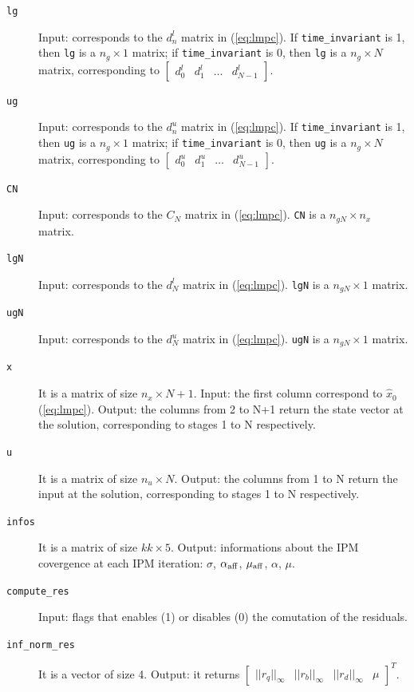 \documentclass[a4paper]{report}
\begin{document}
\begin{description}
\item[\tt lg] Input: corresponds to the $d^l_n$ matrix in (\ref{eq:lmpc}).
If {\tt time\_invariant} is 1, then {\tt lg} is a $n_g\times 1$ matrix; if {\tt time\_invariant} is 0, then {\tt lg} is a $n_g\times N$ matrix, corresponding to $\begin{bmatrix} d^l_0 & d^l_1 & \dots & d^l_{N-1} \end{bmatrix}$.

\item[\tt ug] Input: corresponds to the $d^u_n$ matrix in (\ref{eq:lmpc}).
If {\tt time\_invariant} is 1, then {\tt ug} is a $n_g\times 1$ matrix; if {\tt time\_invariant} is 0, then {\tt ug} is a $n_g\times N$ matrix, corresponding to $\begin{bmatrix} d^u_0 & d^u_1 & \dots & d^u_{N-1} \end{bmatrix}$.

\item[\tt CN] Input: corresponds to the $C_N$ matrix in (\ref{eq:lmpc}).
{\tt CN} is a $n_{gN}\times n_x$ matrix.

\item[\tt lgN] Input: corresponds to the $d^l_N$ matrix in (\ref{eq:lmpc}).
{\tt lgN} is a $n_{gN}\times 1$ matrix.

\item[\tt ugN] Input: corresponds to the $d^u_N$ matrix in (\ref{eq:lmpc}).
{\tt ugN} is a $n_{gN}\times 1$ matrix.

\item[\tt x] It is a matrix of size $n_x \times N+1$.
Input: the first column correspond to $\hat x_0$ (\ref{eq:lmpc}).
Output: the columns from 2 to N+1 return the state vector at the solution, corresponding to stages 1 to N respectively.

\item[\tt u] It is a matrix of size $n_u \times N$.
Output: the columns from 1 to N return the input at the solution, corresponding to stages 1 to N respectively.

\item[\tt infos] It is a matrix of size $kk \times 5$.
Output: informations about the IPM covergence at each IPM iteration: $\sigma$, $\alpha_{\rm aff}$, $\mu_{\rm aff}$, $\alpha$, $\mu$.

\item[\tt compute\_res] Input: flags that enables (1) or disables (0) the comutation of the residuals.

\item[\tt inf\_norm\_res] It is a vector of size 4.
Output: it returns $\begin{bmatrix} ||r_q||_\infty & ||r_b||_\infty & ||r_d||_\infty & \mu \end{bmatrix}^T$.


\end{description}
\end{document}
